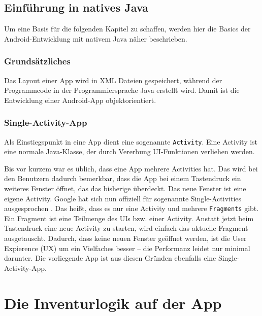 \hypertarget{einfuxfchrung-in-natives-java}{%
\section{Einführung in natives
Java}\label{einfuxfchrung-in-natives-java}}

Um eine Basis für die folgenden Kapitel zu schaffen, werden hier die
Basics der Android-Entwicklung mit nativem Java näher beschrieben.

\hypertarget{grundsuxe4tzliches}{%
\subsection{Grundsätzliches}\label{grundsuxe4tzliches}}

Das Layout einer App wird in XML Dateien gespeichert, während der
Programmcode in der Programmiersprache Java erstellt wird. Damit ist die
Entwicklung einer Android-App objektorientiert.

\hypertarget{single-activity-app}{%
\subsection{Single-Activity-App}\label{single-activity-app}}

Als Einstiegspunkt in eine App dient eine sogenannte \texttt{Activity}.
Eine Activity ist eine normale Java-Klasse, der durch Vererbung
UI-Funktionen verliehen werden.

Bis vor kurzem war es üblich, dass eine App mehrere Activities hat. Das
wird bei den Benutzern dadurch bemerkbar, dass die App \zB bei einem
Tastendruck ein weiteres Fenster öffnet, das das bisherige überdeckt.
Das neue Fenster ist eine eigene Activity. Google hat sich nun offiziell
für sogenannte Single-Activities ausgesprochen \cite{single-activity}.
Das heißt, dass es nur eine Activity und mehrere \texttt{Fragments}
gibt. Ein Fragment ist eine Teilmenge des UIs bzw. einer Activity.
Anstatt jetzt beim Tastendruck eine neue Activity zu starten, wird
einfach das aktuelle Fragment ausgetauscht. Dadurch, dass keine neuen
Fenster geöffnet werden, ist die User Expierence (UX) um ein Vielfaches
besser -- die Performanz leidet nur minimal darunter. Die vorliegende
App ist aus diesen Gründen ebenfalls eine Single-Activity-App.

\chapter{Die Inventurlogik auf der App}
\label{inventurlogik_auf_der_app}

